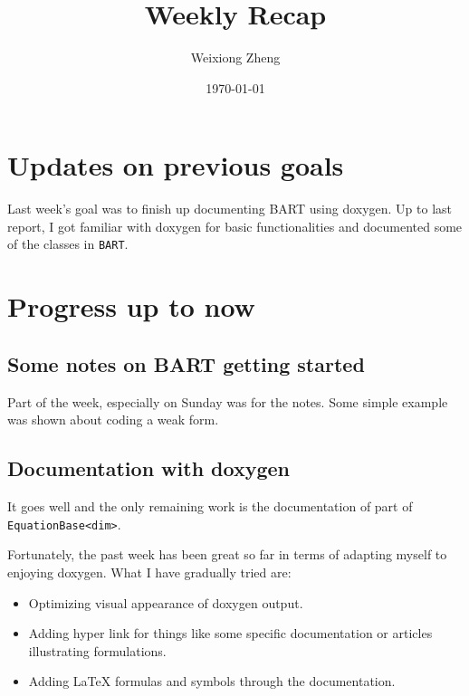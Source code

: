 \documentclass{article}
\title{Weekly Recap} %
\author{Weixiong Zheng} %
\date{\today} %
\begin{document}
\maketitle %

\section{Updates on previous goals}
Last week's goal was to finish up documenting BART using doxygen. Up to last report,
I got familiar with doxygen for basic functionalities and documented some of the classes
in {\tt BART}.

\section{Progress up to now}

\subsection{Some notes on BART getting started}
Part of the week, especially on Sunday was for the notes. Some simple example was shown about coding a weak form.

\subsection{Documentation with doxygen}
It goes well and the only remaining work is the documentation of part of {\tt EquationBase<dim>}.

Fortunately, the past week has been great so far in terms of adapting myself to enjoying
doxygen. What I have gradually tried are:
\begin{itemize}
	\item Optimizing visual appearance of doxygen output.
	\item Adding hyper link for things like some specific documentation or articles illustrating formulations.
	\item Adding LaTeX formulas and symbols through the documentation.
\end{itemize}
\end{document}
